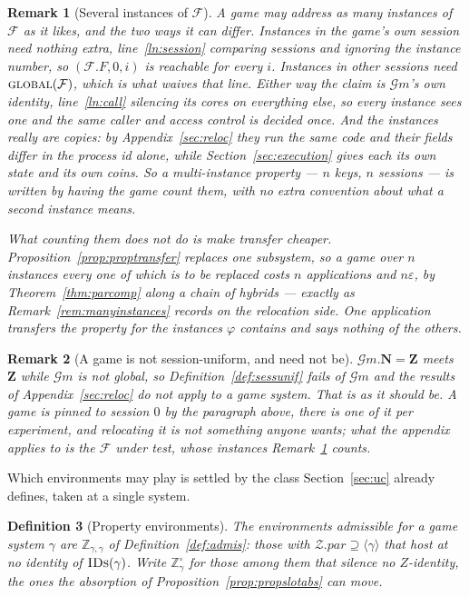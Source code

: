 \documentclass[11pt,a4paper]{article}
\newcommand{\admits}{\mathbf{N}}
\newcommand{\Zpid}{\mathbf{Z}}
\newcommand{\pars}{\mathit{par}}
\newcommand{\F}{\mathcal{F}}
\newcommand{\Zenv}{\mathcal{Z}}
\newcommand{\ZenvSet}{\mathbb{Z}}
\newcommand{\op}[1]{\textsc{#1}}
\newcommand{\IDs}{\op{IDs}}
\newcommand{\Gm}{\mathcal{G}m}
\newcommand{\ncl}[1]{\langle #1 \rangle}
\theoremstyle{accentdef}
\newtheorem{definition}{Definition}[section]
\newtheorem{remark}[definition]{Remark}
\theoremstyle{accentplain}
\begin{document}
\begin{remark}[Several instances of $\F$]\label{rem:gminstances}
A game may address as many instances of $\F$ as it likes, and the two ways it can differ.
Instances in the game's own session need nothing extra, line~\ref{ln:session} comparing sessions and
ignoring the instance number, so $(\F.F,0,i)$ is reachable for every $i$. Instances in other sessions
need $\op{global}(\F)$, which is what waives that line. Either way the claim is $\Gm$'s own identity,
line~\ref{ln:call} silencing its cores on everything else, so every instance sees one and the same
caller and access control is decided once. And the instances really are copies: by
Appendix~\ref{sec:reloc} they run the same code and their fields differ in the process id alone, while
Section~\ref{sec:execution} gives each its own state and its own coins. So a multi-instance property
--- $n$ keys, $n$ sessions --- is written by having the game count them, with no extra convention
about what a second instance means.

What counting them does not do is make transfer cheaper. Proposition~\ref{prop:proptransfer} replaces
one subsystem, so a game over $n$ instances every one of which is to be replaced costs $n$
applications and $n\varepsilon$, by Theorem~\ref{thm:parcomp} along a chain of hybrids --- exactly as
Remark~\ref{rem:manyinstances} records on the relocation side. One application transfers the property
for the instances $\varphi$ contains and says nothing of the others.
\end{remark}

\begin{remark}[A game is not session-uniform, and need not be]\label{rem:gmsessunif}
$\Gm.\admits = \Zpid$ meets $\Zpid$ while $\Gm$ is not global, so Definition~\ref{def:sessunif} fails
of $\Gm$ and the results of Appendix~\ref{sec:reloc} do not apply to a game system. That is as it
should be. A game is pinned to session $0$ by the paragraph above, there is one of it per experiment,
and relocating it is not something anyone wants; what the appendix applies to is the $\F$ under test,
whose instances Remark~\ref{rem:gminstances} counts.
\end{remark}

Which environments may play is settled by the class Section~\ref{sec:uc} already defines, taken at a
single system.

\begin{definition}[Property environments]\label{def:propenv}
The environments \emph{admissible for} a game system $\gamma$ are $\ZenvSet_{\gamma,\gamma}$ of
Definition~\ref{def:admis}: those with $\Zenv.\pars \supseteq \ncl{\gamma}$ that host at no identity
of $\IDs(\gamma)$. Write $\ZenvSet^{\circ}_{\gamma}$ for those among them that silence no $Z$-identity,
the ones the absorption of Proposition~\ref{prop:propslotabs} can move.
\end{definition}
\end{document}
